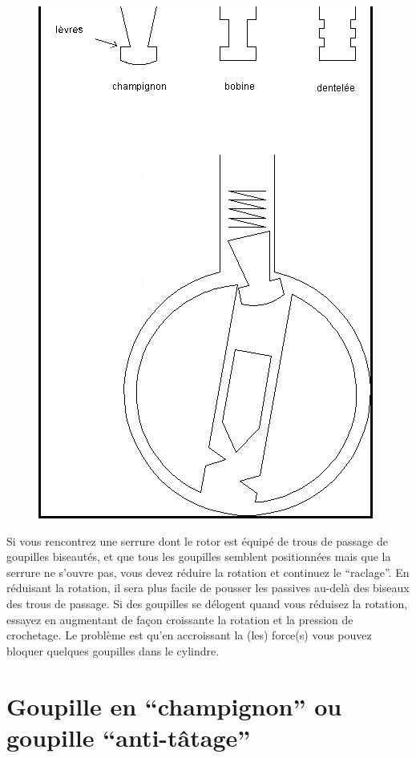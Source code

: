 \documentclass[a4paper,french,11pt,twoside]{report}
\begin{document}
\begin{figure}[h] \begin{center}
        \includegraphics[scale=0.5]{images/Image23}
        \caption{}
\end{center} \end{figure}

Si vous rencontrez une serrure dont le rotor est équipé de trous de passage de goupilles biseautés, et que tous les goupilles semblent positionnées mais que la serrure ne s'ouvre pas, vous devez réduire la rotation et continuez le \enquote{raclage}. En réduisant la rotation, il sera plus facile de pousser les passives au-delà des biseaux des trous de passage. Si des goupilles se délogent quand vous réduisez la rotation, essayez en augmentant de façon croissante la rotation et la pression de crochetage. Le problème est qu'en accroissant la (les) force(s) vous pouvez bloquer quelques goupilles dans le cylindre.

\section{Goupille en  \enquote{champignon} ou goupille \enquote{anti-tâtage}}
\end{document}
